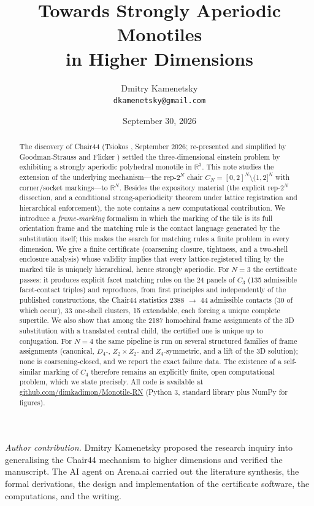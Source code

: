 \documentclass[11pt,a4paper]{article}
\title{Towards Strongly Aperiodic Monotiles\\ in Higher Dimensions}
\author{Dmitry Kamenetsky\\ \texttt{dkamenetsky@gmail.com}}
\date{September 30, 2026}
\theoremstyle{plain}
\theoremstyle{definition}
\begin{document}
\maketitle
\begin{abstract}
The discovery of Chair44 (Tsiokos \cite{tsiokos}, September 2026; re-presented and simplified by Goodman-Strauss \cite{gs2026} and Flicker \cite{flicker}) settled the three-dimensional einstein problem by exhibiting a strongly aperiodic polyhedral monotile in $\mathbb{R}^3$. This note studies the extension of the underlying mechanism---the rep-$2^N$ chair $C_N = [0,2]^N \setminus (1,2]^N$ with corner/socket markings---to $\mathbb{R}^N$. Besides the expository material (the explicit rep-$2^N$ dissection, and a conditional strong-aperiodicity theorem under lattice registration and hierarchical enforcement), the note contains a new computational contribution. We introduce a \emph{frame-marking} formalism in which the marking of the tile is its full orientation frame and the matching rule is the contact language generated by the substitution itself; this makes the search for matching rules a finite problem in every dimension. We give a finite certificate (coarsening closure, tightness, and a two-shell enclosure analysis) whose validity implies that every lattice-registered tiling by the marked tile is uniquely hierarchical, hence strongly aperiodic. For $N=3$ the certificate passes: it produces explicit facet matching rules on the 24 panels of $C_3$ (135 admissible facet-contact triples) and reproduces, from first principles and independently of the published constructions, the Chair44 statistics 2388 $\to$ 44 admissible contacts (30 of which occur), 33 one-shell clusters, 15 extendable, each forcing a unique complete supertile. We also show that among the 2187 homochiral frame assignments of the 3D substitution with a translated central child, the certified one is unique up to conjugation. For $N=4$ the same pipeline is run on several structured families of frame assignments (canonical, $D_4$-, $Z_2 \times Z_2$- and $Z_4$-symmetric, and a lift of the 3D solution); none is coarsening-closed, and we report the exact failure data. The existence of a self-similar marking of $C_4$ therefore remains an explicitly finite, open computational problem, which we state precisely. All code is available at \href{https://github.com/dimkadimon/Monotile-RN}{github.com/dimkadimon/Monotile-RN} (Python 3, standard library plus NumPy for figures).
\end{abstract}
\noindent\emph{Author contribution.} Dmitry Kamenetsky proposed the research inquiry into generalising the Chair44 mechanism to higher dimensions and verified the manuscript. The AI agent on Arena.ai carried out the literature synthesis, the formal derivations, the design and implementation of the certificate software, the computations, and the writing.
\end{document}
